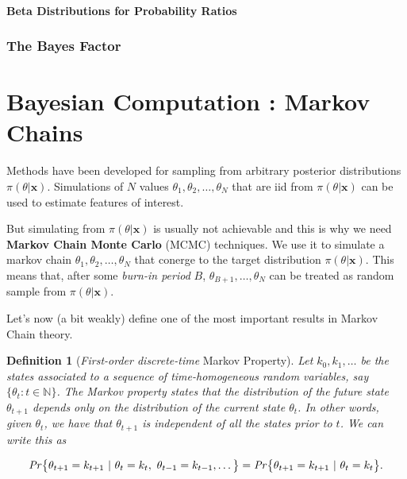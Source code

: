 \documentclass[11pt,a4paper,openany ]{book}
\newtheorem{definition}{Definition}[chapter]
\begin{document}
\paragraph{Beta Distributions for Probability Ratios}



\subsubsection*{The Bayes Factor}




\section{Bayesian Computation : Markov Chains}


Methods have been developed for sampling from arbitrary posterior distributions $\pi(\theta|\boldsymbol{x})$. Simulations of $N$ values $\theta_1,\theta_2,\dots,\theta_N$ that are iid from $\pi(\theta|\boldsymbol{x})$ can be used to estimate features of interest.

But simulating from $\pi(\theta|\boldsymbol{x})$ is usually not achievable and this is why we need \textbf{Markov Chain Monte Carlo} (MCMC) techniques. 
We use it to simulate a markov chain $\theta_1,\theta_2,\dots,\theta_N$ that conerge to the target distribution $\pi(\theta|\boldsymbol{x})$.
This means that, after some \emph{burn-in period} $B$, $\theta_{B+1},\dots,\theta_N$ can be treated as random sample from $\pi(\theta|\boldsymbol{x})$.


Let's now (a bit weakly) define one of the most important results in Markov Chain theory.

\begin{definition}[\emph{First-order discrete-time} Markov Property]
	Let $k_0,k_1,\dots$ be the states associated to a sequence of time-homogeneous random variables, say $\big\{\theta_t:t\in\mathbb{N}\big\}$.
	The Markov property states that the distribution of the future state $\theta_{t+1}$ depends only on the distribution of the current state $\theta_{t}$. 
	In other words, given $\theta_{t}$, we have that $\theta_{t+1}$ is independent of all the states prior to $t$. We can write this as
	
	\begin{equation}
	\text{\emph{Pr}}\big\{\theta_{t+1}=k_{t+1}\ |\ \theta_t=k_t,\ \theta_{t-1}=k_{t-1},\dots\big\} = \text{\emph{Pr}}\big\{\theta_{t+1}=k_{t+1}\ | \ \theta_t=k_t\big\}.
	\end{equation}
\end{definition} 
\end{document}
